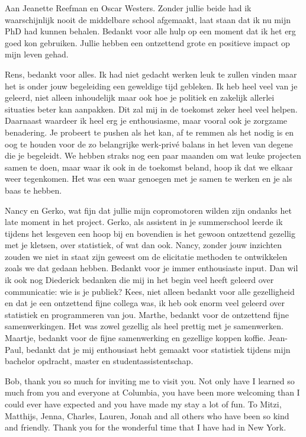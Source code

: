 \documentclass[openright,titlepage,12pt,a4paper]{book}
\begin{document}
Aan Jeanette Reefman en Oscar Westers. Zonder jullie beide had ik waarschijnlijk nooit de middelbare school afgemaakt, laat staan dat ik nu mijn PhD had kunnen behalen. Bedankt voor alle hulp op een moment dat ik het erg goed kon gebruiken. Jullie hebben een ontzettend grote en positieve impact op mijn leven gehad.

Rens, bedankt voor alles. Ik had niet gedacht werken leuk te zullen vinden maar het is onder jouw begeleiding een geweldige tijd gebleken. Ik heb heel veel van je geleerd, niet alleen inhoudelijk maar ook hoe je politiek en zakelijk allerlei situaties beter kan aanpakken. Dit zal mij in de toekomst zeker heel veel helpen. Daarnaast waardeer ik heel erg je enthousiasme, maar vooral ook je zorgzame benadering. Je probeert te pushen als het kan, af te remmen als het nodig is en oog te houden voor de zo belangrijke werk-privé balans in het leven van degene die je begeleidt. We hebben straks nog een paar maanden om wat leuke projecten samen te doen, maar waar ik ook in de toekomst beland, hoop ik dat we elkaar weer tegenkomen. Het was een waar genoegen met je samen te werken en je als baas te hebben.

Nancy en Gerko, wat fijn dat jullie mijn copromotoren wilden zijn ondanks het late moment in het project. Gerko, als assistent in je summerschool leerde ik tijdens het lesgeven een hoop bij en bovendien is het gewoon ontzettend gezellig met je kletsen, over statistiek, of wat dan ook. Nancy, zonder jouw inzichten zouden we niet in staat zijn geweest om de elicitatie methoden te ontwikkelen zoals we dat gedaan hebben. Bedankt voor je immer enthousiaste input. Dan wil ik ook nog Diederick bedanken die mij in het begin veel heeft geleerd over communicatie: wie is je publiek? Kees, niet alleen bedankt voor alle gezelligheid en dat je een ontzettend fijne collega was, ik heb ook enorm veel geleerd over statistiek en programmeren van jou. Marthe, bedankt voor de ontzettend fijne samenwerkingen. Het was zowel gezellig als heel prettig met je samenwerken. Maartje, bedankt voor de fijne samenwerking en gezellige koppen koffie. Jean-Paul, bedankt dat je mij enthousiast hebt gemaakt voor statistiek tijdens mijn bachelor opdracht, master en studentassistentschap.

\newpage

Bob, thank you so much for inviting me to visit you. Not only have I learned so much from you and everyone at Columbia, you have been more welcoming than I could ever have expected and you have made my stay a lot of fun. To Mitzi, Matthijs, Jenna, Charles, Lauren, Jonah and all others who have been so kind and friendly. Thank you for the wonderful time that I have had in New York.
\end{document}
